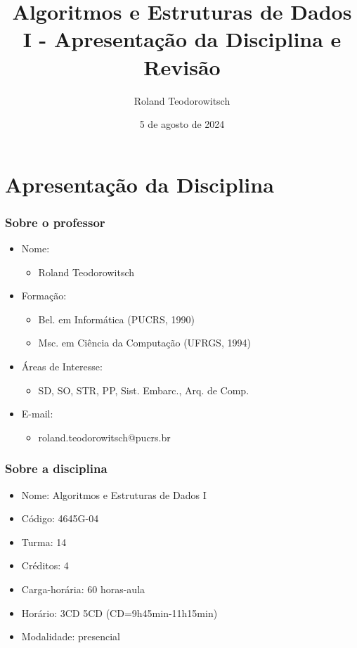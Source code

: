 \documentclass[aspectratio=169]{beamer}
\title[\sc{ALEST I - Apresentação da Disciplina e Revisão}]{Algoritmos e Estruturas de Dados I - Apresentação da Disciplina e Revisão}
\author[Roland Teodorowitsch]{Roland Teodorowitsch}
\institute[ALEST I - EP - PUCRS]{Algoritmos e Estruturas de Dados I - Escola Politécnica - PUCRS}
\date{5 de agosto de 2024}
\begin{document}
\justifying

\begin{frame}
	\titlepage
\end{frame}

\section{Apresenta\c{c}\~ao da Disciplina}

\begin{frame}\frametitle{Sobre o professor}
\begin{itemize}
	\item Nome:
		\begin{itemize}
			\item Roland Teodorowitsch
		\end{itemize}
	\item Forma\c{c}\~ao:
		\begin{itemize}
			\item Bel. em Inform\'atica (PUCRS, 1990)
			\item Msc. em Ci\^encia da Computa\c{c}\~ao (UFRGS, 1994)
		\end{itemize}
	\item \'Areas de Interesse:
		\begin{itemize}
			\item SD, SO, STR, PP, Sist. Embarc., Arq. de Comp.
		\end{itemize}
	\item E-mail:
		\begin{itemize}
			\item roland.teodorowitsch@pucrs.br
		\end{itemize}
\end{itemize}
\end{frame}

\begin{frame}\frametitle{Sobre a disciplina}
\begin{itemize}
	\item Nome: Algoritmos e Estruturas de Dados I
	\item Código: 4645G-04
	\item Turma: 14
	\item Cr\'editos: 4
	\item Carga-horária: 60 horas-aula
	\item Hor\'ario: 3CD 5CD (CD=9h45min-11h15min)
	\item Modalidade: presencial
\end{itemize}
\end{frame}
\end{document}
